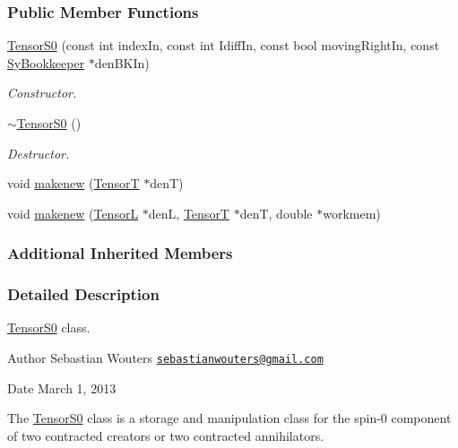 \subsubsection*{Public Member Functions}
\begin{DoxyCompactItemize}
\item 
\hyperlink{classCheMPS2_1_1TensorS0_a862df3a3f5650891950e20ee80729cda}{Tensor\-S0} (const int index\-In, const int Idiff\-In, const bool moving\-Right\-In, const \hyperlink{classCheMPS2_1_1SyBookkeeper}{Sy\-Bookkeeper} $\ast$den\-B\-K\-In)
\begin{DoxyCompactList}\small\item\em Constructor. \end{DoxyCompactList}\item 
\hypertarget{classCheMPS2_1_1TensorS0_ace3bc035b03bcbf1b0a8f94b96977465}{\hyperlink{classCheMPS2_1_1TensorS0_ace3bc035b03bcbf1b0a8f94b96977465}{$\sim$\-Tensor\-S0} ()}\label{classCheMPS2_1_1TensorS0_ace3bc035b03bcbf1b0a8f94b96977465}

\begin{DoxyCompactList}\small\item\em Destructor. \end{DoxyCompactList}\item 
void \hyperlink{classCheMPS2_1_1TensorS0_a09b9ad3cb125b902abbb3a658e3a60b7}{makenew} (\hyperlink{classCheMPS2_1_1TensorT}{Tensor\-T} $\ast$den\-T)
\item 
void \hyperlink{classCheMPS2_1_1TensorS0_ad4e092203dac9cedc8e5d6ecc7e60dce}{makenew} (\hyperlink{classCheMPS2_1_1TensorL}{Tensor\-L} $\ast$den\-L, \hyperlink{classCheMPS2_1_1TensorT}{Tensor\-T} $\ast$den\-T, double $\ast$workmem)
\end{DoxyCompactItemize}
\subsubsection*{Additional Inherited Members}


\subsubsection{Detailed Description}
\hyperlink{classCheMPS2_1_1TensorS0}{Tensor\-S0} class. \begin{DoxyAuthor}{Author}
Sebastian Wouters \href{mailto:sebastianwouters@gmail.com}{\tt sebastianwouters@gmail.\-com} 
\end{DoxyAuthor}
\begin{DoxyDate}{Date}
March 1, 2013
\end{DoxyDate}
The \hyperlink{classCheMPS2_1_1TensorS0}{Tensor\-S0} class is a storage and manipulation class for the spin-\/0 component of two contracted creators or two contracted annihilators. 

